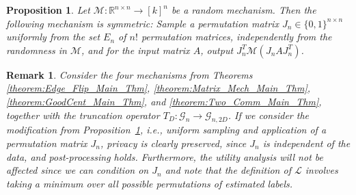 \documentclass{article}
\newtheorem{remark}{Remark}
\newtheorem{proposition}{Proposition}
\newcommand{\calM}{\mathcal{M}}
\begin{document}
\begin{proposition}
\label{lemma:symmetrization}
Let $\calM: \mathbb{R}^{n\times n} \rightarrow [k]^n$ be a random mechanism. Then the following mechanism is symmetric: Sample a permutation matrix $J_n \in \{0, 1\}^{n \times n}$ uniformly from the set $E_n$ of $n!$ permutation matrices, independently from the randomness in $\calM$, and for the input matrix $A$, output $J_n^T\calM(J_nAJ_n^T)$.
\end{proposition}

\begin{remark}
Consider the four mechanisms from Theorems \ref{theorem:Edge_Flip_Main_Thm}, \ref{theorem:Matrix_Mech_Main_Thm}, \ref{theorem:GoodCent_Main_Thm}, and \ref{theorem:Two_Comm_Main_Thm}, together with the truncation operator $T_{D} : \mathcal{G}_n \rightarrow \mathcal{G}_{n, 2D}$. If we consider the modification from Proposition~\ref{lemma:symmetrization}, i.e., uniform sampling and application of a permutation matrix $J_n$, privacy is clearly  preserved, since $J_n$ is independent of the data, and post-processing holds. Furthermore, the utility analysis will not be affected since we can condition on $J_n$ and note that the definition of $\mathcal{L}$ involves taking a minimum over all possible permutations of estimated labels.

\end{remark}

\end{document}
